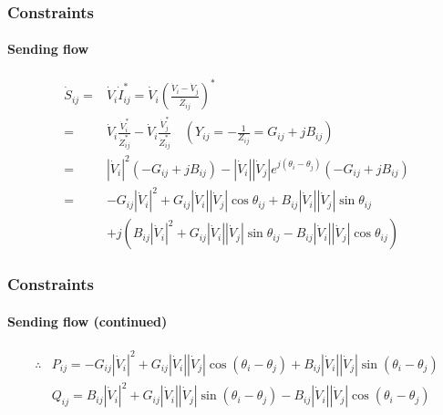 \documentclass[
	11pt, %
	aspectratio=169, %
]{beamer}
\begin{document}
\begin{frame}
	\frametitle{Constraints}
	\framesubtitle{Sending flow} %

	\begin{align*}
		\dot{S}_{ij}=&\dot{V}_{i}\dot{I}_{ij}^{*} = \dot{V}_{i}\left( \frac{\dot{V}_{i}-\dot{V}_{j}}{\dot{Z}_{ij}}   \right) ^{*}  \\
		=&\dot{V}_{i}\frac{\dot{V}_{i}^{*}}{\dot{Z}_{ij}^{*}} - \dot{V}_{i}\frac{\dot{V}_{j}^{*}}{\dot{Z}_{ij}^{*}} \quad \left(Y_{ij} =-\frac{1}{Z_{ij}} = G_{ij}+jB_{ij}\right) \\
		=&\left\lvert \dot{V}_{i}\right\rvert^{2} \left(-G_{ij}+jB_{ij}\right) - \left\lvert \dot{V}_{i}\right\rvert\left\lvert \dot{V}_{j}\right\rvert e^{j\left(\theta_{i}-\theta_{j}\right) } \left(-G_{ij}+jB_{ij}\right)\\
		=&-G_{ij}\left\lvert \dot{V}_{i}\right\rvert^{2} + G_{ij}\left\lvert \dot{V}_{i}\right\rvert\left\lvert \dot{V}_{j}\right\rvert \cos{\theta_{ij}} + B_{ij}\left\lvert \dot{V}_{i}\right\rvert\left\lvert \dot{V}_{j}\right\rvert \sin{\theta_{ij}}  \\
		 &+j\left( B_{ij}\left\lvert \dot{V}_{i}\right\rvert^{2} + G_{ij}\left\lvert \dot{V}_{i}\right\rvert\left\lvert \dot{V}_{j}\right\rvert \sin{\theta_{ij}} - B_{ij}\left\lvert \dot{V}_{i}\right\rvert\left\lvert \dot{V}_{j}\right\rvert \cos{\theta_{ij}} \right) 
	\end{align*}

	
\end{frame}


\begin{frame}
	\frametitle{Constraints}
	\framesubtitle{Sending flow (continued)} %

	\begin{align*}
	 	\therefore &P_{ij}=-G_{ij}\left\lvert \dot{V}_{i}\right\rvert^{2} + G_{ij}\left\lvert \dot{V}_{i}\right\rvert\left\lvert \dot{V}_{j}\right\rvert \cos{\left(\theta_{i}-\theta_{j}\right)} + B_{ij}\left\lvert \dot{V}_{i}\right\rvert\left\lvert \dot{V}_{j}\right\rvert \sin{\left(\theta_{i}-\theta_{j}\right)}\\
		&Q_{ij}=B_{ij}\left\lvert \dot{V}_{i}\right\rvert^{2} + G_{ij}\left\lvert \dot{V}_{i}\right\rvert\left\lvert \dot{V}_{j}\right\rvert \sin{\left(\theta_{i}-\theta_{j}\right)} - B_{ij}\left\lvert \dot{V}_{i}\right\rvert\left\lvert \dot{V}_{j}\right\rvert \cos{\left(\theta_{i}-\theta_{j}\right)}
	\end{align*}

	
\end{frame}
\end{document}
